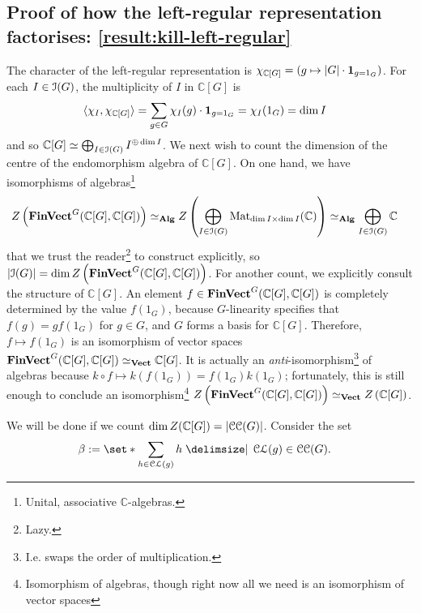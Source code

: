 \subsection{Proof of how the left-regular representation factorises: \ref{result:kill-left-regular}} %
\pan The character of the left-regular representation is $\chi_{\mathbb{C}[G]} = (g \mapsto \lvert G \rvert \cdot \mathbf{1}_{g = 1_G})$. For each $I \in \operatorname{\mathcal{I}}(G)$, the multiplicity of $I$ in $\mathbb{C}[G]$ is
\begin{align*}
  \langle \chi_I, \chi_{\mathbb{C}[G]} \rangle
  &= \sum_{g \in G}
    \chi_I (g)
    \cdot \mathbf{1}_{g = 1_G}
  = \chi_I (1_G)
  = \dim I
\end{align*}
and so $\mathbb{C}[G] \simeq \bigoplus_{I \in \operatorname{\mathcal{I}}(G)} I^{\oplus \dim I}$. We next wish to count the dimension of the centre of the endomorphism algebra of $\mathbb{C}[G]$. On one hand, we have isomorphisms of algebras\footnote{Unital, associative $\mathbb{C}$-algebras.}
\begin{align*}
  Z\left(
    \operatorname{\mathbf{FinVect}}^G (\mathbb{C}[G], \mathbb{C}[G])
  \right)
  &\simeq_{\operatorname{\mathbf{Alg}}} Z\left(
    \bigoplus_{I \in \operatorname{\mathcal{I}}(G)}
      \operatorname{Mat}_{\dim I \times \dim I} (\mathbb{C})
  \right)
  \simeq_{\operatorname{\mathbf{Alg}}} \bigoplus_{I \in \operatorname{\mathcal{I}}(G)} \mathbb{C}
\end{align*}
that we trust the reader\footnote{Lazy.} to construct explicitly, so $
  \lvert \operatorname{\mathcal{I}}(G) \rvert
  = \dim Z\left(
    \operatorname{\mathbf{FinVect}}^G (
      \mathbb{C}[G]
    , \mathbb{C}[G]
    )
  \right)
$. For another count, we explicitly consult the structure of $\mathbb{C}[G]$. An element $f \in \operatorname{\mathbf{FinVect}}^G (\mathbb{C}[G], \mathbb{C}[G])$ is completely determined by the value $f(1_G)$, because $G$-linearity specifies that $f(g) = g f(1_G)$ for $g \in G$, and $G$ forms a basis for $\mathbb{C}[G]$. Therefore, $f \mapsto f(1_G)$ is an isomorphism of vector spaces $\operatorname{\mathbf{FinVect}}^G (\mathbb{C}[G], \mathbb{C}[G]) \simeq_{\operatorname{\mathbf{Vect}}} \mathbb{C}[G]$. It is actually an \textit{anti}-isomorphism\footnote{I.e. swaps the order of multiplication.} of algebras because $k \circ f \mapsto k(f(1_G)) = f(1_G) k(1_G)$; fortunately, this is still enough to conclude an isomorphism\footnote{Isomorphism of algebras, though right now all we need is an isomorphism of vector spaces} $
  Z\left(
    \operatorname{\mathbf{FinVect}}^G (\mathbb{C}[G], \mathbb{C}[G])
  \right)
  \simeq_{\operatorname{\mathbf{Vect}}} Z\left( \mathbb{C}[G] \right)
$.
\par We will be done if we count $\dim Z(\mathbb{C}[G]) = \lvert \operatorname{\mathcal{CC}}(G) \rvert$. Consider the set
\begin{align*}
  \beta
  &:= \set*{
    \sum_{h \in \Class(g)} h
  \given
    \Class(g) \in \Classes(G)
  }
  .
\end{align*}

